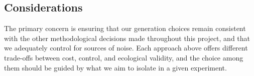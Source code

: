 \documentclass[11pt]{article}
\begin{document}
\subsection{Considerations}

The primary concern is ensuring that our generation choices remain consistent with the other methodological decisions made throughout this project, and that we adequately control for sources of noise. Each approach above offers different trade-offs between cost, control, and ecological validity, and the choice among them should be guided by what we aim to isolate in a given experiment.
\end{document}
